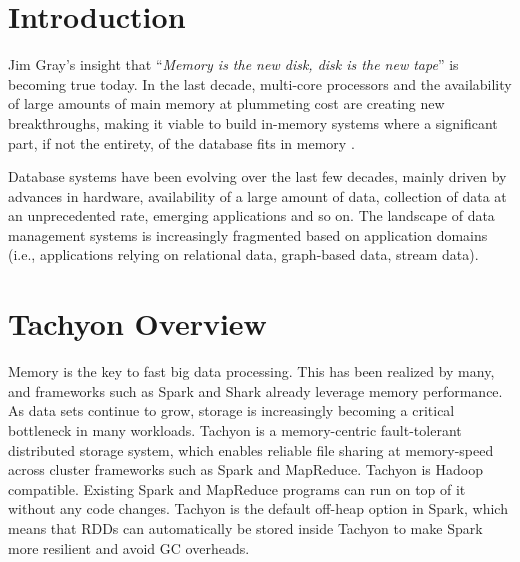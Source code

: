 \documentclass[twocolumn]{article}
\newcommand*\DNA{\textsc{dna}}
\newcommand*\Let[2]{\State #1 $\gets$ #2}
\begin{document}

\section{Introduction}
Jim Gray's insight that ``\textit{Memory is the new disk, disk is the new tape}'' is becoming true today. 
In the last decade, multi-core processors and the availability of large amounts of main memory at
plummeting cost are creating new breakthroughs, making it viable to
build in-memory systems where a significant part, if not the entirety,
of the database fits in memory \cite{Hao:2015}.

Database systems have been evolving over the last few decades, mainly
driven by advances in hardware, availability of a large amount of data,
collection of data at an unprecedented rate, emerging applications and
so on. The landscape of data management systems is increasingly
fragmented based on application domains (i.e., applications relying on
relational data, graph-based data, stream data).

\section{Tachyon Overview}
Memory is the key to fast big data processing. This has been realized by many, and frameworks such as Spark and Shark already leverage memory performance. As data sets continue to grow, storage is increasingly becoming a critical bottleneck in many workloads.
Tachyon is a memory-centric fault-tolerant distributed storage system, which enables reliable file sharing at memory-speed across cluster frameworks such as Spark and MapReduce. 
Tachyon is Hadoop compatible. Existing Spark and MapReduce programs can run on top of it without any code changes. Tachyon is the default off-heap option in Spark, which means that RDDs can automatically be stored inside Tachyon to make Spark more resilient and avoid GC overheads. 



\end{document}
